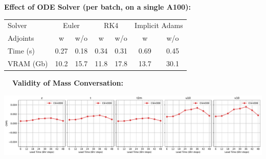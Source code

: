 \documentclass[landscape,a1paper,fontscale=0.424]{baposter}
\begin{document}
\begin{poster}
{        \begin{minipage}[t]{0.48\textwidth}
            \vspace{0.5em}
            \textbf{\color{blue}Effect of ODE Solver (per batch, on a single A100):}\\[0.2em]
            \begin{tabular}{lcccccc}
                \hline
                Solver & \multicolumn{2}{c}{Euler} & \multicolumn{2}{c}{RK4} & \multicolumn{2}{c}{Implicit Adams} \\
                Adjoints & w & w/o & w & w/o & w & w/o \\
                \hline
                Time (s) & {\cellcolor[HTML]{FEDDBC}} \color[HTML]{000000} 0.27 & {\cellcolor[HTML]{FFF5EB}} \color[HTML]{000000} 0.18 & {\cellcolor[HTML]{FDBF86}} \color[HTML]{000000} 0.34 & {\cellcolor[HTML]{FDCFA0}} \color[HTML]{000000} 0.31 & {\cellcolor[HTML]{7F2704}} \color[HTML]{F1F1F1} 0.69 & {\cellcolor[HTML]{FA8532}} \color[HTML]{F1F1F1} 0.45 \\
                VRAM (Gb) & {\cellcolor[HTML]{FFF5EB}} \color[HTML]{000000} 10.2 & {\cellcolor[HTML]{FDC997}} \color[HTML]{000000} 15.7 & {\cellcolor[HTML]{FEECD9}} \color[HTML]{000000} 11.8 & {\cellcolor[HTML]{FDAD69}} \color[HTML]{000000} 17.8 & {\cellcolor[HTML]{FEDDBC}} \color[HTML]{000000} 13.7 & {\cellcolor[HTML]{7F2704}} \color[HTML]{F1F1F1} 30.1 \\
                \hline
            \end{tabular}
        \end{minipage}\hfill
        \begin{minipage}[t]{0.5\textwidth}
            \vspace{0.5em}
            \textbf{\color{blue}~~Validity of Mass Conversation:}
            \vspace{-0.5em}
            \begin{center}
                \includegraphics[width=\textwidth]{mass_conservation.pdf}
            \end{center}
        \end{minipage}
    }
\end{poster}
\end{document}
